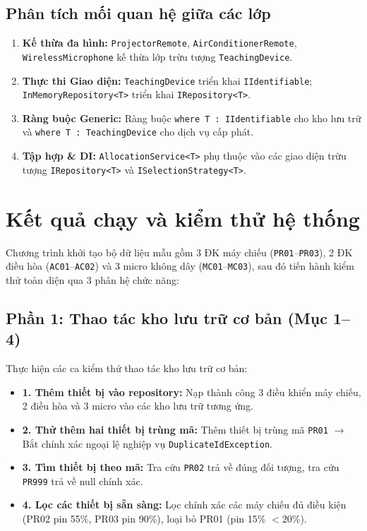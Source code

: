 \documentclass[11pt,a4paper]{article}
\begin{document}
\newpage

\subsection{Phân tích mối quan hệ giữa các lớp}
\begin{enumerate}[itemsep=1.5pt]
    \item \textbf{Kế thừa đa hình:} \texttt{ProjectorRemote}, \texttt{AirConditionerRemote}, \texttt{WirelessMicrophone} kế thừa lớp trừu tượng \texttt{TeachingDevice}.
    \item \textbf{Thực thi Giao diện:} \texttt{TeachingDevice} triển khai \texttt{IIdentifiable}; \texttt{InMemoryRepository<T>} triển khai \texttt{IRepository<T>}.
    \item \textbf{Ràng buộc Generic:} Ràng buộc \texttt{where T : IIdentifiable} cho kho lưu trữ và \texttt{where T : TeachingDevice} cho dịch vụ cấp phát.
    \item \textbf{Tập hợp \& DI:} \texttt{AllocationService<T>} phụ thuộc vào các giao diện trừu tượng \texttt{IRepository<T>} và \texttt{ISelectionStrategy<T>}.
\end{enumerate}

\section{Kết quả chạy và kiểm thử hệ thống}
Chương trình khởi tạo bộ dữ liệu mẫu gồm 3 ĐK máy chiếu (\texttt{PR01}--\texttt{PR03}), 2 ĐK điều hòa (\texttt{AC01}--\texttt{AC02}) và 3 micro không dây (\texttt{MC01}--\texttt{MC03}), sau đó tiến hành kiểm thử toàn diện qua 3 phân hệ chức năng:

\subsection{Phần 1: Thao tác kho lưu trữ cơ bản (Mục 1--4)}
Thực hiện các ca kiểm thử thao tác kho lưu trữ cơ bản:
\begin{itemize}[itemsep=1.2pt]
    \item \textbf{1. Thêm thiết bị vào repository:} Nạp thành công 3 điều khiển máy chiếu, 2 điều hòa và 3 micro vào các kho lưu trữ tương ứng.
    \item \textbf{2. Thử thêm hai thiết bị trùng mã:} Thêm thiết bị trùng mã \texttt{PR01} $\rightarrow$ Bắt chính xác ngoại lệ nghiệp vụ \texttt{DuplicateIdException}.
    \item \textbf{3. Tìm thiết bị theo mã:} Tra cứu \texttt{PR02} trả về đúng đối tượng, tra cứu \texttt{PR999} trả về null chính xác.
    \item \textbf{4. Lọc các thiết bị sẵn sàng:} Lọc chính xác các máy chiếu đủ điều kiện (PR02 pin 55\%, PR03 pin 90\%), loại bỏ PR01 (pin 15\% $< 20\%$).
\end{itemize}
\end{document}
